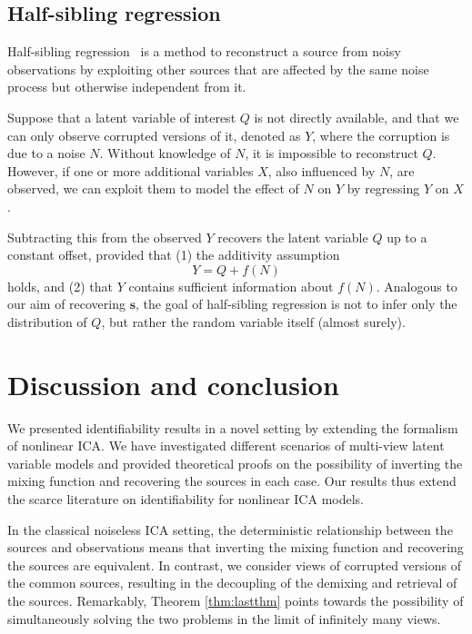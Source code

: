 \subsection{Half-sibling regression}
\label{sec:hsr}
Half-sibling regression~\cite{scholkopf2016modeling} is a method to reconstruct a source from noisy observations by exploiting other sources that are affected by the same noise process but otherwise independent from it.

Suppose that a latent variable of interest $Q$ is not directly available, and that we can only observe corrupted versions of it, denoted as  $Y$, where the corruption is due to a noise $N$.
Without knowledge of $N$, it is impossible to reconstruct $Q$. However, if one or more additional variables $X$, also influenced by $N$, are observed, we can exploit them to model the effect of $N$ on $Y$ by regressing $Y$ on $X$.

Subtracting this from the observed $Y$ recovers the latent variable $Q$ up to a constant offset,
provided that (1) the additivity assumption
\[
Y = Q + f(N)
\]
holds, and (2) that $Y$ contains sufficient information about $f(N)$.
Analogous to our aim of recovering $\bm{s}$,
the goal of half-sibling regression is not to infer only the distribution of $Q$, but rather the random variable itself (almost surely).




\section{Discussion and conclusion}
\label{sec:on_suffistv}
We presented identifiability results in a novel setting by extending the formalism of nonlinear ICA.
We have investigated different scenarios of multi-view latent variable models and provided theoretical proofs on the possibility of inverting the mixing function and recovering the sources in each case.
Our results thus extend the scarce literature on identifiability for nonlinear ICA models.

In the classical noiseless ICA setting, the deterministic relationship between the sources and observations means that inverting the mixing function and recovering the sources are equivalent.
In contrast, we consider views of corrupted versions of the common sources, resulting in the decoupling of the demixing and retrieval of the sources.
Remarkably, Theorem \ref{thm:lastthm} points towards the possibility of simultaneously solving the two problems in the limit of infinitely many views.


